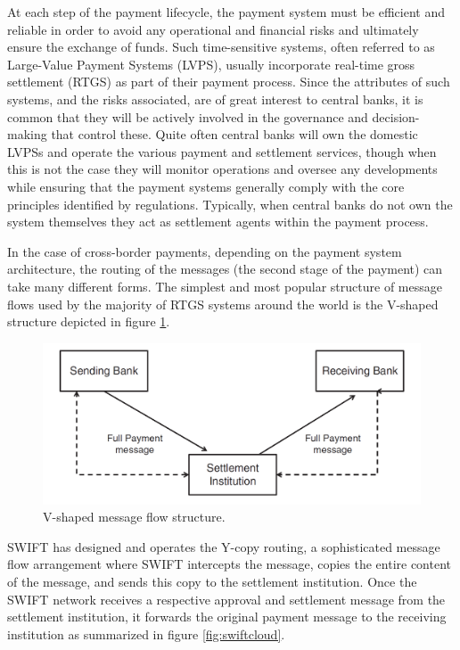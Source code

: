 \documentclass[12pt]{article}
\begin{document}
        At each step of the payment lifecycle, the payment system must be efficient and reliable in order to avoid any operational and financial risks and ultimately ensure the exchange of funds. Such time-sensitive systems, often referred to as Large-Value Payment Systems (LVPS), usually incorporate real-time gross settlement (RTGS) as part of their payment process. Since the attributes of such systems, and the risks associated, are of great interest to central banks, it is common that they will be actively involved in the governance and decision-making that control these. Quite often central banks will own the domestic LVPSs and operate the various payment and settlement services, though when this is not the case they will monitor operations and oversee any developments while ensuring that the payment systems generally comply with the core principles identified by regulations. Typically, when central banks do not own the system themselves they act as settlement agents within the payment process. 
        
        In the case of cross-border payments, depending on the payment system architecture, the routing of the messages (the second stage of the payment) can take many different forms. The simplest and most popular structure of message flows used by the majority of RTGS systems around the world is the V-shaped structure depicted in figure \ref{fig:vshape}.
        
        \begin{figure}[H]
        \centering
        \includegraphics[width=\textwidth,cfbox=red 0.1mm 0.1mm]{figures/vshape.png}
        \caption{V-shaped message flow structure.}
        \label{fig:vshape}
        \end{figure}
        
        SWIFT has designed and operates the Y-copy routing, a sophisticated message flow arrangement where SWIFT intercepts the message, copies the entire content of the message, and sends this copy to the settlement institution. Once the SWIFT network receives a respective approval and settlement message from the settlement institution, it forwards the original payment message to the receiving institution as summarized in figure \ref{fig:swiftcloud}.
        
\end{document}
